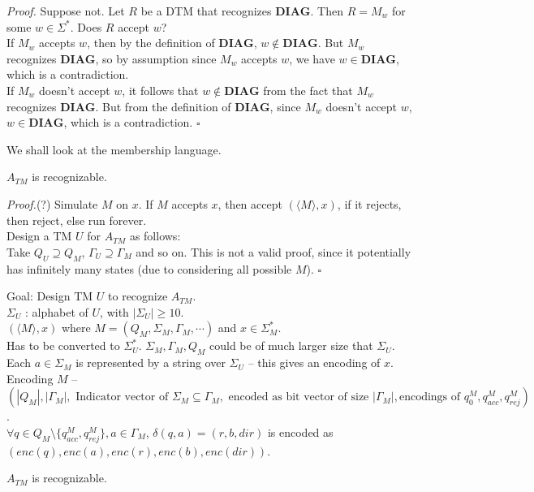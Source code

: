 \documentclass[a4paper]{article}
\newenvironment{proof}{\begin{breakbox}\textit{Proof.}}{\hfill$\square$\end{breakbox}}
\newcommand{\nl}{\vspace{0.2cm}\\}
\newcommand{\mf}{\mathbf}
\begin{document}
\begin{proof}
    Suppose not. Let $R$ be a DTM that recognizes $\mf{DIAG}$. Then $R = M_w$ for some $w \in \Sigma^*$. Does $R$ accept $w$?\nl
    If $M_w$ accepts $w$, then by the definition of $\mf{DIAG}$, $w \not\in \mf{DIAG}$. But $M_w$ recognizes $\mf{DIAG}$, so by assumption since $M_w$ accepts $w$, we have $w \in
    \mf{DIAG}$, which is a contradiction.\nl
    If $M_w$ doesn't accept $w$, it follows that $w \not\in \mf{DIAG}$ from the fact that $M_w$ recognizes $\mf{DIAG}$. But from the definition of $\mf{DIAG}$, since $M_w$ doesn't accept $w$, $w \in
    \mf{DIAG}$, which is a contradiction.
\end{proof}

We shall look at the membership language.\nl

\begin{theorem}
    $A_{TM}$ is recognizable.
\end{theorem}

\begin{proof}(?)
    Simulate $M$ on $x$. If $M$ accepts $x$, then accept $(\langle M \rangle, x)$, if it rejects, then reject, else run forever.\nl
    Design a TM $U$ for $A_{TM}$ as follows:\nl
    Take $Q_U \supseteq Q_M$, $\Gamma_U \supseteq \Gamma_M$ and so on. This is not a valid proof, since it potentially has infinitely many states (due to considering all possible $M$).
\end{proof}

Goal: Design TM $U$ to recognize $A_{TM}$.\nl

$\Sigma_U$ : alphabet of $U$, with $|\Sigma_U| \ge 10$.\nl

$(\langle M \rangle, x)$ where $M = (Q_M, \Sigma_M, \Gamma_M, \cdots)$ and $x \in \Sigma_M^*$.\nl

Has to be converted to $\Sigma_U^*$. $\Sigma_M, \Gamma_M, Q_M$ could be of much larger size that $\Sigma_U$.\nl

Each $a \in \Sigma_M$ is represented by a string over $\Sigma_U$ -- this gives an encoding of $x$.\nl

Encoding $M$ -- $(|Q_M|, |\Gamma_M|, \text{ Indicator vector of }\Sigma_M \subseteq \Gamma_M, \text{ encoded as bit vector of size }|\Gamma_M|, \text{encodings of }q_0^M, q_{acc}^M,q_{rej}^M)$.\nl

$\forall q \in Q_M \setminus \{q_{acc}^M, q_{rej}^M\}, a \in \Gamma_M$, $\delta(q, a) = (r, b, dir)$ is encoded as $(enc(q), enc(a), enc(r), enc(b), enc(dir))$.\nl

\begin{theorem}
    $A_{TM}$ is recognizable.
\end{theorem}
\end{document}
